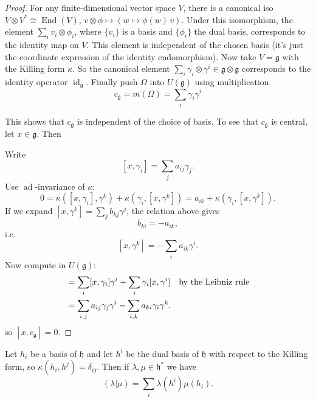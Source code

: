\documentclass[12pt]{article}
\begin{document}
\begin{proof}
    For any finite-dimensional vector space $V$, there is a canonical iso
    $V \otimes V^* \cong \operatorname{End}(V)$, $v\otimes \phi \mapsto (w \mapsto \phi(w)\,v)$. Under this isomorphism, the element $\sum_i v_i \otimes \phi_i$, where $\{v_i\}$ is a basis and $\{\phi_i\}$ the dual basis, corresponds to the identity map on $V$. This element is independent of the chosen basis (it's just the coordinate expression of the identity endomorphism). Now take $V = \mathfrak{g}$ with the Killing form $\kappa$. So the canonical element $\sum_i \gamma_i \otimes \gamma^i \in \mathfrak{g} \otimes \mathfrak{g}$ corresponds to the identity operator $\operatorname{id}_{\mathfrak{g}}$. Finally push $\Omega$ into $U(\mathfrak{g})$ using multiplication \[c_{\mathfrak{g}} = m(\Omega) = \sum_i \gamma_i \gamma^i\]

    This shows that $c_{\mathfrak{g}}$ is independent of the choice of basis. To see that $c_{\mathfrak{g}}$ is central, let $x \in \mathfrak{g}$. Then

    Write
    \[
        [x, \gamma_i] = \sum_j a_{ij} \gamma_j.
    \]
    Use $\operatorname{ad}$-invariance of $\kappa$:
    \[
        0 = \kappa([x, \gamma_i], \gamma^k) + \kappa(\gamma_i, [x, \gamma^k])
        = a_{ik} + \kappa(\gamma_i, [x, \gamma^k]).
    \]
    If we expand $[x, \gamma^k] = \sum_j b_{kj} \gamma^j$, the relation above gives
    \[
        b_{ki} = -a_{ik},
    \]
    i.e.
    \[
        [x, \gamma^k] = -\sum_i a_{ik} \gamma^i.
    \]
    Now compute in $U(\mathfrak{g})$:
    \begin{align*}
        [x, c_{\mathfrak{g}}]
         & = \sum_i [x, \gamma_i] \gamma^i + \sum_i \gamma_i [x, \gamma^i] \texty{by the Leibniz rule} \\
         & = \sum_{i, j} a_{ij} \gamma_j \gamma^i - \sum_{i, k} a_{ki} \gamma_i \gamma^k.
    \end{align*}
    so $[x, c_{\mathfrak{g}}] = 0$.
\end{proof}

\begin{proposition}
    Let $h_i$ be a basis of $\mathfrak{h}$ and let $h^i$ be the dual basis of $\mathfrak{h}$
    with respect to the Killing form, so $\kappa(h_i, h^j) = \delta_{ij}$.
    Then if $\lambda, \mu \in \mathfrak{h}^*$ we have
    \[
        (\lambda | \mu) = \sum_i \lambda(h^i)\mu(h_i).
    \]
\end{proposition}
\end{document}
